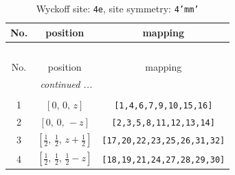 \documentclass[fleqn,8pt]{jsarticle}
\begin{document}
\renewcommand{\arraystretch}{1.2}
\begin{longtable}{ccc}
\caption{Wyckoff site: {\tt 4e}, site symmetry: {\tt 4'mm'}}
 \\
 \hline \hline
No. & position & mapping \\ \hline \endfirsthead

\multicolumn{2}{l}{\tablename\ \thetable{}} \\
 \hline \hline
No. & position & mapping \\ \hline \endhead

 \hline \hline
\multicolumn{2}{r}{\footnotesize\it continued ...} \\ \endfoot

 \hline \hline
\multicolumn{2}{r}{} \\ \endlastfoot

1 & $\left[ 0,\, 0,\, z \right]$ & {\tt [1,4,6,7,9,10,15,16]} \\ \hline
2 & $\left[ 0,\, 0,\, - z \right]$ & {\tt [2,3,5,8,11,12,13,14]} \\ \hline
3 & $\left[ \frac{1}{2},\, \frac{1}{2},\, z + \frac{1}{2} \right]$ & {\tt [17,20,22,23,25,26,31,32]} \\ \hline
4 & $\left[ \frac{1}{2},\, \frac{1}{2},\, \frac{1}{2} - z \right]$ & {\tt [18,19,21,24,27,28,29,30]} \\
\end{longtable}
\renewcommand{\arraystretch}{1.2}
\end{document}
